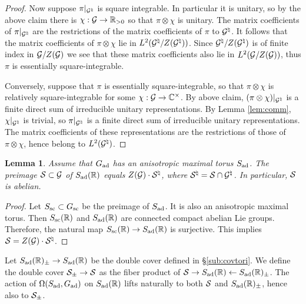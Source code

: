 \documentclass{article}
\newtheorem{lem}[thm]{Lemma}
\theoremstyle{definition}
\numberwithin{equation}{section}
\renewcommand{\-}{\hyp{}}
\begin{document}
\begin{proof}
Now suppose $\pi|_{\mathcal{G}^\natural}$ is square integrable. In particular it is unitary, so by the above claim there is $\chi : \mathcal{G} \to \mathbb{R}_{>0}$ so that $\pi\otimes\chi$ is unitary. The matrix coefficients of $\pi|_{\mathcal{G}^\natural}$ are the restrictions of the matrix coefficients of $\pi$ to $\mathcal{G}^\natural$. It follows that the matrix coefficients of $\pi\otimes\chi$ lie in $L^2(\mathcal{G}^\natural/Z(\mathcal{G}^\natural))$. Since $\mathcal{G}^\natural/Z(\mathcal{G}^\natural)$ is of finite index in $\mathcal{G}/Z(\mathcal{G})$ we see that these matrix coefficients also lie in $L^2(\mathcal{G}/Z(\mathcal{G}))$, thus $\pi$ is essentially square-integrable.

Conversely, suppose that $\pi$ is essentially square-integrable, so that $\pi\otimes\chi$ is relatively square-integrable for some $\chi : \mathcal{G} \to \mathbb{C}^\times$. By above claim, $(\pi\otimes\chi)|_{\mathcal{G}^\natural}$ is a finite direct sum of irreducible unitary representations. By Lemma \ref{lem:comm}, $\chi|_{\mathcal{G}^\natural}$ is trivial, so $\pi|_{\mathcal{G}^\natural}$ is a finite direct sum of irreducible unitary representations. The matrix coefficients of these representations are the restrictions of those of $\pi\otimes\chi$, hence belong to $L^2(\mathcal{G}^\natural)$.
\end{proof}

\begin{lem} \label{lem:ani}
Assume that $G_{\textrm{ad}}$ has an anisotropic maximal torus $S_{\textrm{ad}}$. The preimage $\mathcal{S} \subset \mathcal{G}$ of $S_{\textrm{ad}}(\mathbb{R})$ equals $Z(\mathcal{G}) \cdot \mathcal{S}^\natural$, where $\mathcal{S}^\natural = \mathcal{S} \cap \mathcal{G}^\natural$. In particular, $\mathcal{S}$ is abelian.
\end{lem}
\begin{proof}
	Let $S_{\textrm{sc}} \subset G_{\textrm{sc}}$ be the preimage of $S_{\textrm{ad}}$. It is also an anisotropic maximal torus. Then $S_{\textrm{sc}}(\mathbb{R})$ and $S_{\textrm{ad}}(\mathbb{R})$ are connected compact abelian Lie groups. Therefore, the natural map $S_{\textrm{sc}}(\mathbb{R}) \to S_{\textrm{ad}}(\mathbb{R})$ is surjective. This implies $\mathcal{S} = Z(\mathcal{G}) \cdot \mathcal{S}^\natural$.
\end{proof}

Let $S_{\textrm{ad}}(\mathbb{R})_\pm \to S_{\textrm{ad}}(\mathbb{R})$ be the double cover defined in \S\ref{sub:covtori}. We define the double cover $\mathcal{S}_\pm \to \mathcal{S}$ as the fiber product of $\mathcal{S} \to S_{\textrm{ad}}(\mathbb{R}) \leftarrow S_{\textrm{ad}}(\mathbb{R})_\pm$. The action of $\Omega(S_{\textrm{ad}},G_{\textrm{ad}})$ on $S_{\textrm{ad}}(\mathbb{R})$ lifts naturally to both $\mathcal{S}$ and $S_{\textrm{ad}}(\mathbb{R})_\pm$, hence also to $\mathcal{S}_\pm$.
\end{document}
